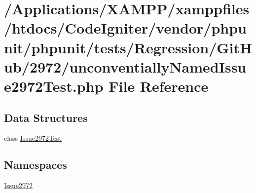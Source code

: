 \hypertarget{unconventially_named_issue2972_test_8php}{}\section{/\+Applications/\+X\+A\+M\+P\+P/xamppfiles/htdocs/\+Code\+Igniter/vendor/phpunit/phpunit/tests/\+Regression/\+Git\+Hub/2972/unconventially\+Named\+Issue2972\+Test.php File Reference}
\label{unconventially_named_issue2972_test_8php}
\subsection*{Data Structures}
\begin{DoxyCompactItemize}
\item 
class \mbox{\hyperlink{class_issue2972_1_1_issue2972_test}{Issue2972\+Test}}
\end{DoxyCompactItemize}
\subsection*{Namespaces}
\begin{DoxyCompactItemize}
\item 
 \mbox{\hyperlink{namespace_issue2972}{Issue2972}}
\end{DoxyCompactItemize}

